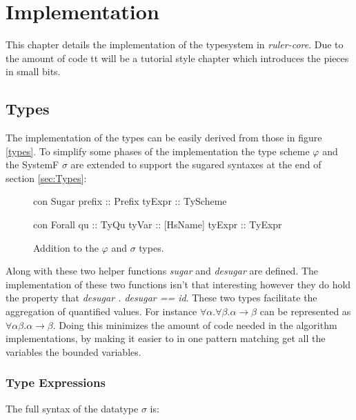 \chapter{Implementation}
This chapter details the implementation of the typesystem in \emph{ruler-core}. Due to the amount of code tt will be a tutorial style chapter which introduces the pieces in small bits.
\section{Types}
The implementation of the types can be easily derived from those in figure \ref{types}. To simplify some phases of the implementation the type scheme $\varphi$ and the SystemF $\sigma$ are extended to support the sugared syntaxes at the end of section \ref{sec:Types}:

\begin{figure}[H]
\begin{minipage}[t]{0.5\linewidth}
\begin{code}
  con Sugar
     prefix  :: Prefix
     tyExpr  :: TyScheme
\end{code}
\end{minipage}
\begin{minipage}[t]{0.5\linewidth}
\begin{code}
  con Forall
    qu        :: TyQu
    tyVar     :: [HsName]
    tyExpr    :: TyExpr 
\end{code} 
\end{minipage}
\caption{Addition to the $\varphi$ and $\sigma$ types.}
\label{abs:fig:types}
\end{figure}

Along with these two helper functions \emph{sugar} and \emph{desugar} are defined. The implementation of these two functions isn't that interesting however they do hold the property that \emph{desugar . desugar == id}. These two types facilitate the aggregation of quantified values. For instance $\forall \alpha . \forall \beta. \alpha \rightarrow \beta$ can be represented as $\forall \alpha \beta . \alpha \rightarrow \beta$. Doing this minimizes the amount of code needed in the algorithm implementations, by making it easier to in one pattern matching get all the variables the bounded variables.
\subsection{Type Expressions}
The full syntax of the datatype $\sigma$ is:

